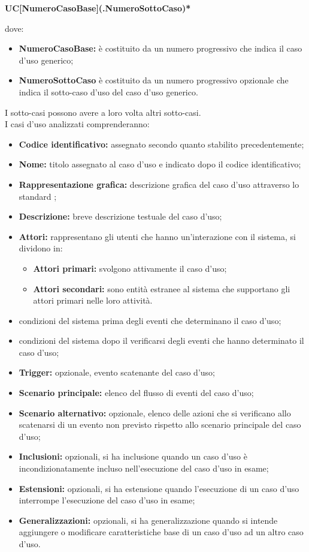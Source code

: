 \begin{center}
	\textbf{UC[NumeroCasoBase](.NumeroSottoCaso)*}
\end{center}
dove:
\begin{itemize}
	\item \textbf{NumeroCasoBase:} è costituito da un numero progressivo che indica il caso d'uso generico;
	\item \textbf{NumeroSottoCaso} è costituito da un numero progressivo opzionale che indica il sotto-caso d'uso del caso d'uso generico.
\end{itemize}  
I sotto-casi possono avere a loro volta altri sotto-casi.\\ 
I casi d'uso analizzati comprenderanno:
\begin{itemize}
	\item \textbf{Codice identificativo:} assegnato secondo quanto stabilito precedentemente;
	\item \textbf{Nome:} titolo assegnato al caso d'uso e indicato dopo il codice identificativo; 
	\item \textbf{Rappresentazione grafica:} descrizione grafica del caso d'uso attraverso lo standard ;
	\item \textbf{Descrizione:} breve descrizione testuale del caso d'uso;
	\item \textbf{Attori:} rappresentano gli utenti che hanno un'interazione con il sistema, si dividono in:
	\begin{itemize}
		\item \textbf{Attori primari:} svolgono attivamente il caso d'uso;
		\item \textbf{Attori secondari:} sono entità estranee al sistema che supportano gli attori primari nelle loro attività.
	\end{itemize}
	\item {} condizioni del sistema prima degli eventi che determinano il caso d'uso;
	\item {} condizioni del sistema dopo il verificarsi degli eventi che hanno determinato il caso d'uso;
	\item \textbf{Trigger:} opzionale, evento scatenante del caso d'uso;
	\item \textbf{Scenario principale:} elenco del flusso di eventi del caso d'uso;
	\item \textbf{Scenario alternativo:} opzionale, elenco delle azioni che si verificano allo scatenarsi di un evento non previsto rispetto allo scenario principale del caso d'uso;
	\item \textbf{Inclusioni:} opzionali, si ha inclusione quando un caso d'uso è incondizionatamente incluso nell'esecuzione del caso d'uso in esame;	
	\item \textbf{Estensioni:} opzionali, si ha estensione quando l'esecuzione di un caso d'uso interrompe l'esecuzione del caso d'uso in esame;
	\item \textbf{Generalizzazioni:} opzionali, si ha generalizzazione quando si intende aggiungere o modificare caratteristiche base di un caso d'uso ad un altro caso d'uso.
\end{itemize}

